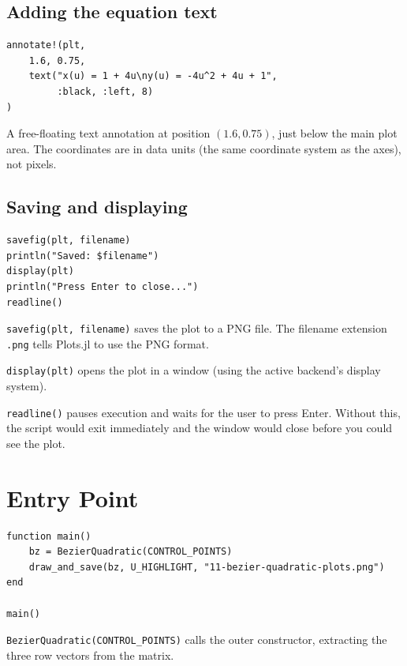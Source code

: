\documentclass[12pt, a4paper]{article}
\newcommand{\cd}[1]{\texttt{#1}}
\begin{document}
\subsection{Adding the equation text}

\begin{verbatim}
annotate!(plt,
    1.6, 0.75,
    text("x(u) = 1 + 4u\ny(u) = -4u^2 + 4u + 1",
         :black, :left, 8)
)
\end{verbatim}

A free-floating text annotation at position $(1.6, 0.75)$,
just below the main plot area.
The coordinates are in data units (the same coordinate
system as the axes), not pixels.

\subsection{Saving and displaying}

\begin{verbatim}
savefig(plt, filename)
println("Saved: $filename")
display(plt)
println("Press Enter to close...")
readline()
\end{verbatim}

\cd{savefig(plt, filename)} saves the plot to a PNG file.
The filename extension \cd{.png} tells Plots.jl to use
the PNG format.

\cd{display(plt)} opens the plot in a window (using the
active backend's display system).

\cd{readline()} pauses execution and waits for the user
to press Enter.
Without this, the script would exit immediately and the
window would close before you could see the plot.


\section{Entry Point}

\begin{verbatim}
function main()
    bz = BezierQuadratic(CONTROL_POINTS)
    draw_and_save(bz, U_HIGHLIGHT, "11-bezier-quadratic-plots.png")
end

main()
\end{verbatim}

\cd{BezierQuadratic(CONTROL\_POINTS)} calls the outer
constructor, extracting the three row vectors from the matrix.
\end{document}
